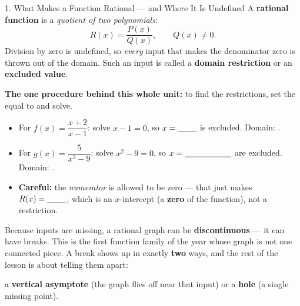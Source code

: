 \documentclass[10pt]{article}
\begin{document}
\begin{notesbox}{1. What Makes a Function Rational --- and Where It Is Undefined}
A \textbf{rational function} is a \emph{quotient of two polynomials}:
\[
  R(x) = \frac{P(x)}{Q(x)}, \qquad Q(x) \neq 0 .
\]
Division by zero is undefined, so \emph{every} input that makes the denominator zero is thrown out of
the domain. Such an input is called a \textbf{domain restriction} or an \textbf{excluded value}.

\vspace{3pt}
\textbf{The one procedure behind this whole unit:} to find the restrictions, set the
\blank{3.6cm} equal to \blank{1.0cm} and solve.
\begin{itemize}[leftmargin=1.5em, itemsep=3pt]
  \item For $f(x)=\dfrac{x+2}{x-1}$: solve $x-1=0$, so $x=\blank{0.8cm}$ is excluded.
        Domain: \blank{5.4cm}.
  \item For $g(x)=\dfrac{5}{x^2-9}$: solve $x^2-9=0$, so $x=\blank{2.0cm}$ are excluded.
        Domain: \blank{5.4cm}.
  \item \textbf{Careful:} the \emph{numerator} is allowed to be zero --- that just makes
        $R(x)=\blank{0.8cm}$, which is an $x$-intercept (a \textbf{zero} of the function), not a
        restriction.
\end{itemize}

\vspace{3pt}
Because inputs are missing, a rational graph can be \textbf{discontinuous} --- it can have breaks.
This is the first function family of the year whose graph is not one connected piece. A break shows up
in exactly \textbf{two} ways, and the rest of the lesson is about telling them apart:
\begin{center}
\small
a \textbf{vertical asymptote} (the graph flies off near that input) \quad or \quad
a \textbf{hole} (a single missing point).
\end{center}
\end{notesbox}
\end{document}
